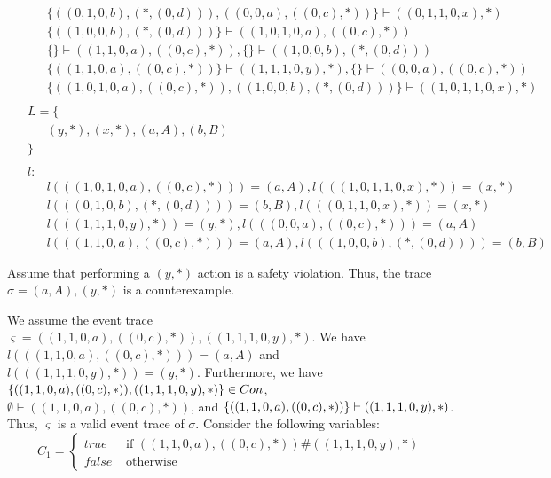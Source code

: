 \documentclass{article}
\begin{document}
\begin{align*}
	 & \qquad \{ ((0, 1, 0, b), (*, (0, d))), ((0, 0, a), ((0, c), *)) \} \vdash ((0, 1, 1, 0, x), *) \\ 
	 & \qquad \{ ((1, 0, 0, b), (*, (0, d))) \} \vdash ((1, 0, 1, 0, a), ((0, c), *)) \\ 
	 & \qquad \{  \} \vdash ((1, 1, 0, a), ((0, c), *)), \{  \} \vdash ((1, 0, 0, b), (*, (0, d))) \\ 
	 & \qquad \{ ((1, 1, 0, a), ((0, c), *)) \} \vdash ((1, 1, 1, 0, y), *), \{  \} \vdash ((0, 0, a), ((0, c), *)) \\ 
	 & \qquad \{ ((1, 0, 1, 0, a), ((0, c), *)), ((1, 0, 0, b), (*, (0, d))) \} \vdash ((1, 0, 1, 1, 0, x), *) \\ 
	 & \ \  & \\ 
	 & \ \ L=\{ & \\ 
	 & \qquad (y, *), (x, *), (a, A), (b, B) \\ 
	 & \ \ \} & \\ 
	 & \ \  & \\ 
	 & \ \ l: & \\ 
	 & \qquad l(((1, 0, 1, 0, a), ((0, c), *))) = (a, A), l(((1, 0, 1, 1, 0, x), *)) = (x, *) \\ 
	 & \qquad l(((0, 1, 0, b), (*, (0, d)))) = (b, B), l(((0, 1, 1, 0, x), *)) = (x, *) \\ 
	 & \qquad l(((1, 1, 1, 0, y), *)) = (y, *), l(((0, 0, a), ((0, c), *))) = (a, A) \\ 
	 & \qquad l(((1, 1, 0, a), ((0, c), *))) = (a, A), l(((1, 0, 0, b), (*, (0, d)))) = (b, B) \\ 
	 & \ \  & \\ 
\end{align*} 
Assume that performing a $(y, *)$ action is a safety violation.
Thus, the trace $\sigma = (a,A),(y,*)$ is a counterexample.

We assume the event trace $\varsigma = ((1, 1, 0, a), ((0, c), *)),((1, 1, 1, 0, y), *)$.
We have $l(((1, 1, 0, a), ((0, c), *))) = (a,A)$ and $l(((1, 1, 1, 0, y), *)) = (y,*)$.
Furthermore, we have $\{((1, 1, 0, a), ((0, c), *)), ((1, 1, 1, 0, y), *)\} \in Con$,
$\emptyset \vdash ((1, 1, 0, a), ((0, c), *))$, and $\{((1, 1, 0, a), ((0, c), *))\} \vdash ((1, 1, 1, 0, y), *)$.
Thus, $\varsigma$ is a valid event trace of $\sigma$.
Consider the following variables:
$$
    C_1 = \begin{cases}
        true & \text{ if } ((1, 1, 0, a), ((0, c), *)) \# ((1, 1, 1, 0, y), *) \\
        false & \text{ otherwise }
    \end{cases}
$$
\end{document}
